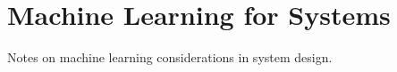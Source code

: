 \documentclass{article}
\begin{document}
\section*{Machine Learning for Systems}
Notes on machine learning considerations in system design.
\end{document}
